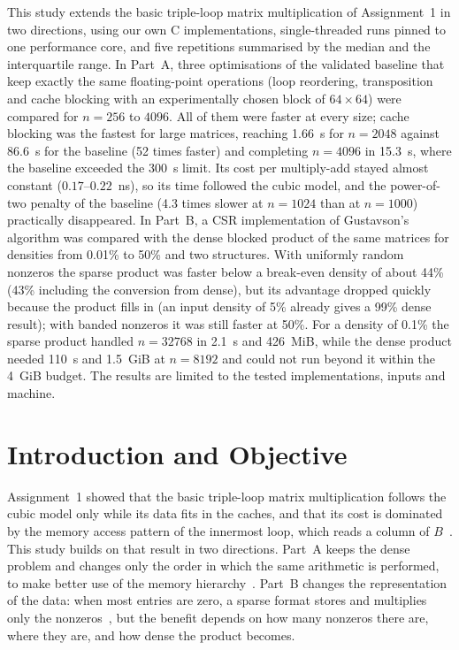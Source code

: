 \documentclass[12pt,a4paper]{report}
\begin{document}
This study extends the basic triple-loop matrix multiplication of Assignment~1 in two directions, using our own C
implementations, single-threaded runs pinned to one performance core, and five repetitions summarised by the median
and the interquartile range. In Part~A, three optimisations of the validated baseline that keep exactly the same
floating-point operations (loop reordering, transposition and cache blocking with an experimentally chosen block of
$64 \times 64$) were compared for $n = 256$ to $4096$. All of them were faster at every size; cache blocking was the
fastest for large matrices, reaching 1.66~s for $n = 2048$ against 86.6~s for the baseline (52 times faster) and
completing $n = 4096$ in 15.3~s, where the baseline exceeded the 300~s limit. Its cost per multiply-add stayed almost
constant ($0.17$--$0.22$~ns), so its time followed the cubic model, and the power-of-two penalty of the baseline
(4.3 times slower at $n = 1024$ than at $n = 1000$) practically disappeared. In Part~B, a CSR implementation of
Gustavson's algorithm was compared with the dense blocked product of the same matrices for densities from 0.01\% to
50\% and two structures. With uniformly random nonzeros the sparse product was faster below a break-even density of
about 44\% (43\% including the conversion from dense), but its advantage dropped quickly because the product fills
in (an input density of 5\% already gives a 99\% dense result); with banded nonzeros it was still faster at 50\%. For
a density of 0.1\% the sparse product handled $n = 32768$ in 2.1~s and 426~MiB, while the dense product needed 110~s
and 1.5~GiB at $n = 8192$ and could not run beyond it within the 4~GiB budget. The results are limited to the tested
implementations, inputs and machine.

\chapter{Introduction and Objective}

Assignment~1 showed that the basic triple-loop matrix multiplication follows the cubic model only while its data fits
in the caches, and that its cost is dominated by the memory access pattern of the innermost loop, which reads a column
of $B$~\cite{a1}. This study builds on that result in two directions. Part~A keeps the dense problem and changes only
the order in which the same arithmetic is performed, to make better use of the memory hierarchy~\cite{lam1991,goto2008}.
Part~B changes the representation of the data: when most entries are zero, a sparse format stores and multiplies only
the nonzeros~\cite{saad2003,davis2006}, but the benefit depends on how many nonzeros there are, where they are, and how
dense the product becomes.
\end{document}
